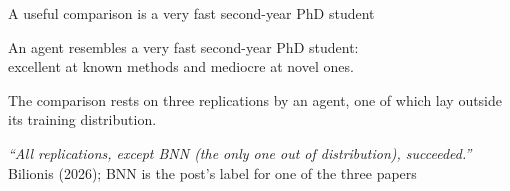 \documentclass[aspectratio=169,10pt]{beamer}
\newcommand{\emphc}[1]{\textcolor{harvardcrimson}{#1}}
\begin{document}
\begin{frame}{A useful comparison is a very fast second-year PhD student}
\begin{center}
{\large An agent resembles a \emphc{very fast second-year PhD student}:\\[5pt] excellent at known methods and mediocre at novel ones.}
\end{center}

\vspace{1.6em}
\begin{center}
\begin{minipage}{0.84\textwidth}
\small\textcolor{uzhgreydark}{The comparison rests on three replications by an agent, one of which lay outside its training distribution.}

\vspace{0.4em}
{\itshape ``All replications, except BNN (the only one out of distribution), succeeded.''}\\[2pt]
\hspace*{\fill}Bilionis (2026); BNN is the post's label for one of the three papers
\end{minipage}
\end{center}
\end{frame}
\end{document}
